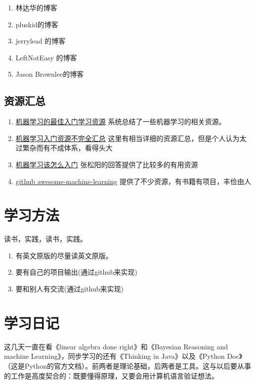 \documentclass[10pt,a4paper,UTF8]{article}
\begin{document}
\begin{enumerate}
\item 林达华的博客
\item pluskid的博客
\item jerrylead 的博客
\item LeftNotEasy 的博客
\item Jason Brownlee的博客
\end{enumerate}
\subsection{资源汇总}
\label{sec:orgbb8d9c8}


\begin{enumerate}
\item \href{http://blog.jobbole.com/56256/}{机器学习的最佳入门学习资源} 系统总结了一些机器学习的相关资源。
\item \href{http://ml.memect.com/article/machine-learning-guide.html}{机器学习入门资源不完全汇总} 这里有相当详细的资源汇总，但是个人认为太过繁杂而有不成体系，看得头大
\item \href{https://www.zhihu.com/question/20691338}{机器学习该怎么入门} 张松阳的回答提供了比较多的有用资源
\item \href{https://github.com/josephmisiti/awesome-machine-learning/blob/master/books.md}{github awesome-machine-learning} 提供了不少资源，有书籍有项目，丰俭由人
\end{enumerate}

\section{学习方法}
\label{sec:org1203fd5}


读书，实践，读书，实践。

\begin{enumerate}
\item 有英文原版的尽量读英文原版。
\item 要有自己的项目输出(通过github来实现)
\item 要和别人有交流(通过github来实现)
\end{enumerate}
\section{学习日记}
\label{sec:org2ed6322}


这几天一直在看《linear algebra done right》和《Bayesian Reasoning and machine Learning》，同步学习的还有《Thinking in Java》以及《Python Doc》（这是Python的官方文档）。前两者是理论基础，后两者是工具。这与以后要从事的工作是高度契合的：既要懂得原理，又要会用计算机语言验证想法。
\end{document}
